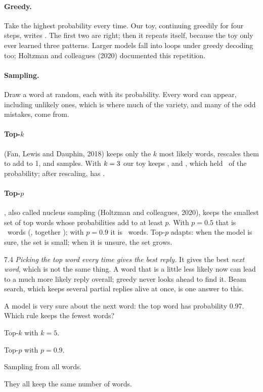 \paragraph{Greedy.} Take the highest probability every time. Our toy, continuing  greedily for
four steps, writes \nSevenGreedy. The first two are right; then it repeats itself, because the toy only ever learned
three patterns. Larger models fall into loops under greedy decoding too; Holtzman and colleagues (2020) documented
this repetition.

\paragraph{Sampling.} Draw a word at random, each with its probability. Every word can appear, including unlikely
ones, which is where much of the variety, and many of the odd mistakes, come from.

\paragraph{Top-$k$} (Fan, Lewis and Dauphin, 2018) keeps only the $k$ most likely words, rescales them to add to 1,
and samples. With $k=3$ our toy keeps , \tok{\nSevenSecond} and \tok{\nSevenThird}, which held
\nSevenTopkMass\ of the probability; after rescaling,  has \nSevenTopkSorry.

\paragraph{Top-$p$}, also called nucleus sampling (Holtzman and colleagues, 2020), keeps the smallest set of top
words whose probabilities add to at least $p$. With $p=0.5$ that is \nSevenToppHalfN\ words (\nSevenToppHalfWords,
together \nSevenToppHalfMass); with $p=0.9$ it is \nSevenToppNinetyN\ words. Top-$p$ adapts: when the model is sure,
the set is small; when it is unsure, the set grows.

\begin{wrongidea}{7.4}
\emph{Picking the top word every time gives the best reply.} It gives the best \emph{next word}, which is not the
same thing. A word that is a little less likely now can lead to a much more likely reply overall; greedy never
looks ahead to find it. Beam search, which keeps several partial replies alive at once, is one answer to this.
\end{wrongidea}

\begin{checkq}
A model is very sure about the next word: the top word has probability 0.97. Which rule keeps the fewest words?
\begin{options}
\item Top-$k$ with $k=5$.
\item Top-$p$ with $p=0.9$.
\item Sampling from all words.
\item They all keep the same number of words.
\end{options}
\end{checkq}

